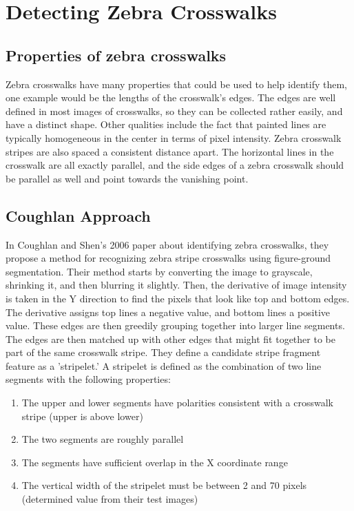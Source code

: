\documentclass[12pt]{ucthesis}
\begin{document}


\chapter{Detecting Zebra Crosswalks}

\section{Properties of zebra crosswalks}

Zebra crosswalks have many properties that could be used to help identify them, one example would be the lengths of the crosswalk's edges. The edges are well defined in most images of crosswalks, so they can be collected rather easily, and have a distinct shape. Other qualities include the fact that painted lines are typically homogeneous in the center in terms of pixel intensity. Zebra crosswalk stripes are also spaced a consistent distance apart. The horizontal lines in the crosswalk are all exactly parallel, and the side edges of a zebra crosswalk should be parallel as well and point towards the vanishing point. 

\section{Coughlan Approach}
In Coughlan and Shen's 2006 paper \cite{Coughlan2006} about identifying zebra crosswalks, they propose a method for recognizing zebra stripe crosswalks using figure-ground segmentation.  Their method starts by converting the image to grayscale, shrinking it, and then blurring it slightly. Then, the derivative of image intensity is taken in the Y direction to find the pixels that look like top and bottom edges. The derivative assigns top lines a negative value, and bottom lines a positive value.  These edges are then greedily grouping together into larger line segments. The edges are then matched up with other edges that might fit together to be part of the same crosswalk stripe. They define a candidate stripe fragment feature as a 'stripelet.' A stripelet is defined as the combination of two line segments with the following properties: 
\begin{enumerate}
  \item The upper and lower segments have polarities consistent with a crosswalk stripe (upper is above lower)
  \item The two segments are roughly parallel
  \item The segments have sufficient overlap in the X coordinate range
  \item The vertical width of the stripelet must be between 2 and 70 pixels (determined value from their test images)
\end{enumerate}
\end{document}
